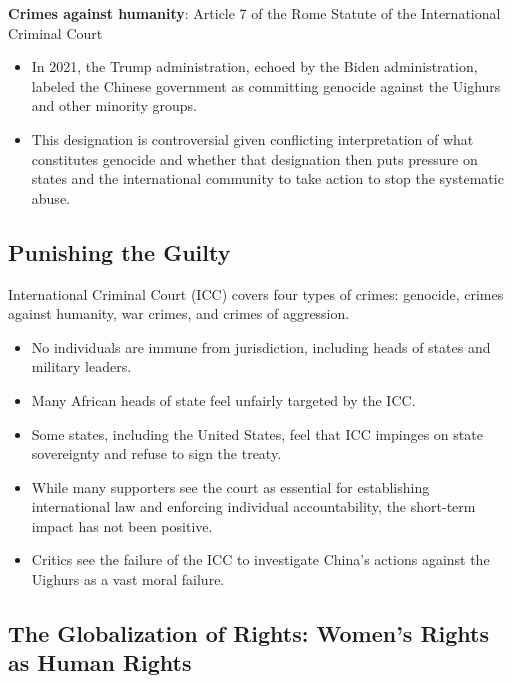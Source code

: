 \documentclass[
]{book}
\begin{document}
\textbf{Crimes against humanity}: Article 7 of the Rome Statute of the International Criminal Court

\begin{itemize}
\item
  In 2021, the Trump administration, echoed by the Biden administration, labeled the Chinese government as committing genocide against the Uighurs and other minority groups.
\item
  This designation is controversial given conflicting interpretation of what constitutes genocide and whether that designation then puts pressure on states and the international community to take action to stop the systematic abuse.
\end{itemize}

\hypertarget{punishing-the-guilty}{%
\subsection{Punishing the Guilty}\label{punishing-the-guilty}}

International Criminal Court (ICC) covers four types of crimes: genocide, crimes against humanity, war crimes, and crimes of aggression.

\begin{itemize}
\item
  No individuals are immune from jurisdiction, including heads of states and military leaders.
\item
  Many African heads of state feel unfairly targeted by the ICC.
\item
  Some states, including the United States, feel that ICC impinges on state sovereignty and refuse to sign the treaty.
\item
  While many supporters see the court as essential for establishing international law and enforcing individual accountability, the short-term impact has not been positive.
\item
  Critics see the failure of the ICC to investigate China's actions against the Uighurs as a vast moral failure.
\end{itemize}

\hypertarget{the-globalization-of-rights-womens-rights-as-human-rights}{%
\subsection{The Globalization of Rights: Women's Rights as Human Rights}\label{the-globalization-of-rights-womens-rights-as-human-rights}}
\end{document}
